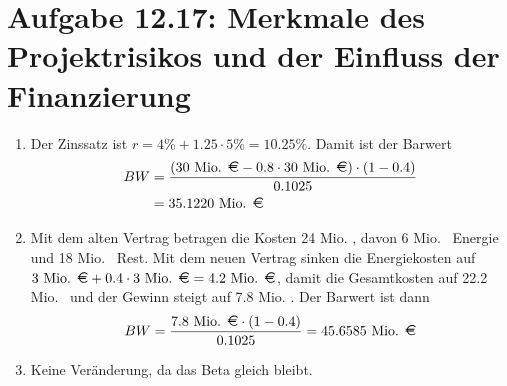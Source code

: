 \documentclass{article}
\begin{document}
	\section*{Aufgabe 12.17: Merkmale des Projektrisikos und der Einfluss der Finanzierung}
	\begin{enumerate}[label=(\alph*)]
		\item Der Zinssatz ist $r=4\% + 1.25\cdot 5\% = 10.25\%$. Damit ist der Barwert
		\begin{align}
			BW &= \frac{(30\text{ Mio. \EUR} - 0.8\cdot 30\text{ Mio. \EUR})\cdot (1-0.4)}{0.1025} \notag \\
			&= 35.1220 \text{ Mio. \EUR} \notag
		\end{align}
		\item Mit dem alten Vertrag betragen die Kosten 24 Mio. \EUR, davon 6 Mio. \EUR\, Energie und 18 Mio. \EUR\, Rest. Mit dem neuen Vertrag sinken die Energiekosten auf $3\text{ Mio. \EUR} + 0.4\cdot 3\text{ Mio. \EUR} = 4.2\text{ Mio. \EUR}$, damit die Gesamtkosten auf 22.2 Mio. \EUR\, und der Gewinn steigt auf 7.8 Mio. \EUR. Der Barwert ist dann
		\begin{align}
			BW = \frac{7.8\text{ Mio. \EUR}\cdot (1-0.4)}{0.1025} = 45.6585\text{ Mio. \EUR}\notag
		\end{align}
		\item Keine Veränderung, da das Beta gleich bleibt.
	\end{enumerate}
	
\end{document}
